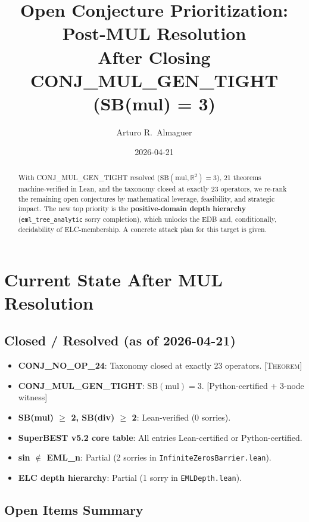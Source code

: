 \documentclass[12pt]{article}
\title{\textbf{Open Conjecture Prioritization: Post-MUL Resolution}\\[0.5em]
\large After Closing CONJ\_MUL\_GEN\_TIGHT (SB(mul) = 3)}
\author{Arturo R.\ Almaguer}
\date{2026-04-21}
\theoremstyle{definition}
\begin{document}
\maketitle

\begin{abstract}
With CONJ\_MUL\_GEN\_TIGHT resolved ($\mathrm{SB}(\mathrm{mul}, \mathbb{R}^2) = 3$),
21 theorems machine-verified in Lean, and the taxonomy closed at exactly 23 operators,
we re-rank the remaining open conjectures by mathematical leverage, feasibility, and
strategic impact.  The new top priority is the \textbf{positive-domain depth hierarchy}
(\texttt{eml\_tree\_analytic} sorry completion), which unlocks the EDB and, conditionally,
decidability of ELC-membership.  A concrete attack plan for this target is given.
\end{abstract}

\section{Current State After MUL Resolution}

\subsection{Closed / Resolved (as of 2026-04-21)}

\begin{itemize}
  \item \textbf{CONJ\_NO\_OP\_24}: Taxonomy closed at exactly 23 operators.  [\textsc{Theorem}]
  \item \textbf{CONJ\_MUL\_GEN\_TIGHT}: $\mathrm{SB}(\mathrm{mul}) = 3$. [Python-certified + 3-node witness]
  \item \textbf{SB(mul) $\geq$ 2, SB(div) $\geq$ 2}: Lean-verified (0 sorries).
  \item \textbf{SuperBEST v5.2 core table}: All entries Lean-certified or Python-certified.
  \item \textbf{sin $\notin$ EML\_n}: Partial (2 sorries in \texttt{InfiniteZerosBarrier.lean}).
  \item \textbf{ELC depth hierarchy}: Partial (1 sorry in \texttt{EMLDepth.lean}).
\end{itemize}

\subsection{Open Items Summary}
\end{document}
